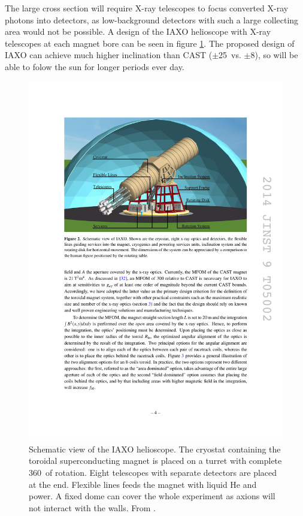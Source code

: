 The large cross section will require X-ray telescopes to focus converted X-ray photons into detectors, as low-background detectors with such a large collecting area would not be possible. A design of the IAXO helioscope\cite{Vogel:2013we,Shilon:1501687,Irastorza:2012tt} with X-ray telescopes at each magnet bore can be seen in figure \ref{fig:iaxo_helioscope}. The proposed design of IAXO can achieve much higher inclination than CAST ($\pm$25\degr\ vs. $\pm$8\degr), so will be able to folow the sun for longer periods ever day.

\begin{figure}[!h]
  \center
\includegraphics[width=0.8\linewidth]{figures/iaxo/iaxo_helioscope.pdf}
\caption{\footnotesize Schematic view of the IAXO helioscope. The cryostat containing the toroidal superconducting magnet is placed on a turret with complete 360\degr\ of rotation. Eight telescopes with separate detectors are placed at the end. Flexible lines feeds the magnet with liquid He and power. A fixed dome can cover the whole experiment as axions will not interact with the walls. From \cite{Armengaud:2014eo}.}\label{fig:iaxo_helioscope}
\end{figure}

